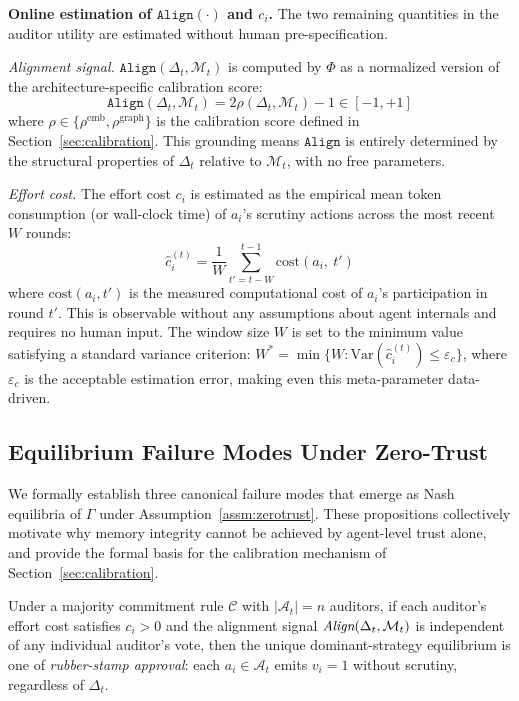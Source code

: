 \textbf{Online estimation of $\texttt{Align}(\cdot)$ and $c_i$.}
The two remaining quantities in the auditor utility are estimated without
human pre-specification.

\textit{Alignment signal.} $\texttt{Align}(\Delta_t, \mathcal{M}_t)$ is
computed by $\Phi$ as a normalized version of the architecture-specific
calibration score:
\begin{equation}
    \texttt{Align}(\Delta_t, \mathcal{M}_t) =
    2\rho(\Delta_t, \mathcal{M}_t) - 1 \in [-1, +1]
\end{equation}
where $\rho \in \{\rho^{\text{emb}}, \rho^{\text{graph}}\}$ is the
calibration score defined in Section~\ref{sec:calibration}. This
grounding means $\texttt{Align}$ is entirely determined by the structural
properties of $\Delta_t$ relative to $\mathcal{M}_t$, with no free
parameters.

\textit{Effort cost.} The effort cost $c_i$ is estimated as the
empirical mean token consumption (or wall-clock time) of $a_i$'s
scrutiny actions across the most recent $W$ rounds:
\begin{equation}
    \hat{c}_i^{(t)} = \frac{1}{W} \sum_{t'=t-W}^{t-1}
    \text{cost}(a_i,\ t')
\end{equation}
where $\text{cost}(a_i, t')$ is the measured computational cost of
$a_i$'s participation in round $t'$. This is observable without any
assumptions about agent internals and requires no human input. The
window size $W$ is set to the minimum value satisfying a standard
variance criterion: $W^* = \min\{W : \text{Var}(\hat{c}_i^{(t)}) \leq
\varepsilon_c\}$, where $\varepsilon_c$ is the acceptable estimation
error, making even this meta-parameter data-driven.

\subsection{Equilibrium Failure Modes Under Zero-Trust}
\label{app:failure_modes}

We formally establish three canonical failure modes that emerge as Nash
equilibria of $\Gamma$ under Assumption~\ref{assm:zerotrust}. These
propositions collectively motivate why memory integrity cannot be achieved
by agent-level trust alone, and provide the formal basis for the
calibration mechanism of Section~\ref{sec:calibration}.

\begin{proposition}
\label{prop:freeriding}
Under a majority commitment rule $\mathcal{C}$ with $|\mathcal{A}_t| = n$
auditors, if each auditor's effort cost satisfies $c_i > 0$ and the
alignment signal $\emph{Align}(\Delta_t, \mathcal{M}_t)$ is independent
of any individual auditor's vote, then the unique dominant-strategy
equilibrium is one of \emph{rubber-stamp approval}: each $a_i \in
\mathcal{A}_t$ emits $v_i = 1$ without scrutiny, regardless of $\Delta_t$.
\end{proposition}

